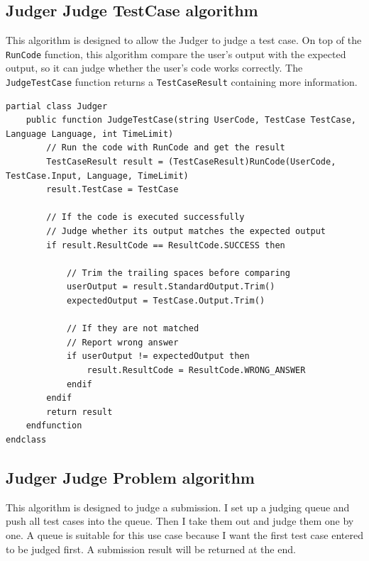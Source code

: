 \documentclass[a4paper]{report}
\begin{document}
\subsection{Judger Judge TestCase algorithm}

This algorithm is designed to allow the Judger to judge a test case. On top of the \texttt{RunCode} function, this algorithm compare the user's output with the expected output, so it can judge whether the user's code works correctly. The \texttt{JudgeTestCase} function returns a \texttt{TestCaseResult} containing more information.

\begin{verbatim}
partial class Judger
    public function JudgeTestCase(string UserCode, TestCase TestCase, Language Language, int TimeLimit)
        // Run the code with RunCode and get the result
        TestCaseResult result = (TestCaseResult)RunCode(UserCode, TestCase.Input, Language, TimeLimit)
        result.TestCase = TestCase

        // If the code is executed successfully
        // Judge whether its output matches the expected output
        if result.ResultCode == ResultCode.SUCCESS then

            // Trim the trailing spaces before comparing
            userOutput = result.StandardOutput.Trim()
            expectedOutput = TestCase.Output.Trim()

            // If they are not matched
            // Report wrong answer
            if userOutput != expectedOutput then
                result.ResultCode = ResultCode.WRONG_ANSWER
            endif
        endif
        return result
    endfunction
endclass  
\end{verbatim}

\subsection{Judger Judge Problem algorithm}

This algorithm is designed to judge a submission. I set up a judging queue and push all test cases into the queue. Then I take them out and judge them one by one. A queue is suitable for this use case because I want the first test case entered to be judged first. A submission result will be returned at the end.
\end{document}
